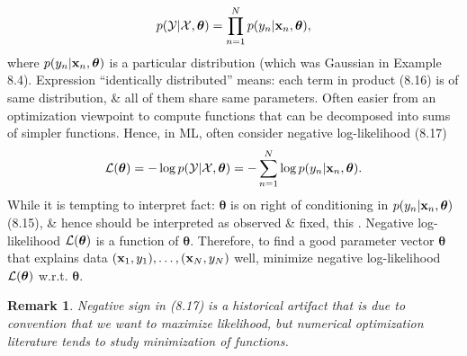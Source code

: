 \documentclass{article}
\newtheorem{remark}{Remark}
\begin{document}
\begin{itemize}
\begin{itemize}
\begin{itemize}
			\begin{equation}
				p({\cal Y}|{\cal X},\boldsymbol{\theta}) = \prod_{n=1}^N p(y_n|{\bf x}_n,\boldsymbol{\theta}),
			\end{equation}
			where $p(y_n|{\bf x}_n,\boldsymbol{\theta})$ is a particular distribution (which was Gaussian in Example 8.4). Expression ``identically distributed'' means: each term in product (8.16) is of same distribution, \& all of them share same parameters. Often easier from an optimization viewpoint to compute functions that can be decomposed into sums of simpler functions. Hence, in ML, often consider negative log-likelihood (8.17)
			\begin{equation}
				{\cal L}(\boldsymbol{\theta}) = -\log p({\cal Y}|{\cal X},\boldsymbol{\theta}) = -\sum_{n=1}^N \log p(y_n|{\bf x}_n,\boldsymbol{\theta}).
			\end{equation}
			While it is tempting to interpret fact: $\boldsymbol{\theta}$ is on right of conditioning in $p(y_n|{\bf x}_n,\boldsymbol{\theta})$ (8.15), \& hence should be interpreted as observed \& fixed, this . Negative log-likelihood ${\cal L}(\boldsymbol{\theta})$ is a function of $\boldsymbol{\theta}$. Therefore, to find a good parameter vector $\boldsymbol{\theta}$ that explains data $({\bf x}_1,y_1),\ldots,({\bf x}_N,y_N)$ well, minimize negative log-likelihood ${\cal L}(\boldsymbol{\theta})$ w.r.t. $\boldsymbol{\theta}$.
			\begin{remark}
				Negative sign in (8.17) is a historical artifact that is due to convention that we want to maximize likelihood, but numerical optimization literature tends to study minimization of functions.
			\end{remark}
			

\end{itemize}
\end{itemize}
\end{itemize}
\end{document}
